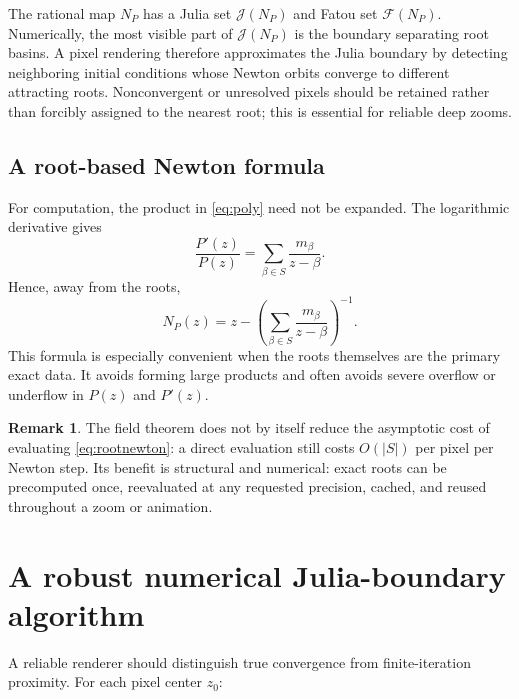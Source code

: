 \documentclass[11pt,a4paper]{article}
\theoremstyle{definition}
\newtheorem{remark}[theorem]{Remark}
\newcommand{\J}{\mathcal{J}}
\newcommand{\Fatou}{\mathcal{F}}
\begin{document}
The rational map $N_P$ has a Julia set $\J(N_P)$ and Fatou set $\Fatou(N_P)$.  Numerically, the most visible part of $\J(N_P)$ is the boundary separating root basins.  A pixel rendering therefore approximates the Julia boundary by detecting neighboring initial conditions whose Newton orbits converge to different attracting roots.  Nonconvergent or unresolved pixels should be retained rather than forcibly assigned to the nearest root; this is essential for reliable deep zooms.

\subsection{A root-based Newton formula}

For computation, the product in \eqref{eq:poly} need not be expanded.  The logarithmic derivative gives
\begin{equation}
\label{eq:logder}
\frac{P'(z)}{P(z)}
=\sum_{\beta\in S}\frac{m_\beta}{z-\beta}.
\end{equation}
Hence, away from the roots,
\begin{equation}
\label{eq:rootnewton}
\boxed{
N_P(z)=z-
\left(
\sum_{\beta\in S}\frac{m_\beta}{z-\beta}
\right)^{-1}.
}
\end{equation}
This formula is especially convenient when the roots themselves are the primary exact data.  It avoids forming large products and often avoids severe overflow or underflow in $P(z)$ and $P'(z)$.

\begin{remark}
The field theorem does not by itself reduce the asymptotic cost of evaluating \eqref{eq:rootnewton}: a direct evaluation still costs $O(|S|)$ per pixel per Newton step.  Its benefit is structural and numerical: exact roots can be precomputed once, reevaluated at any requested precision, cached, and reused throughout a zoom or animation.
\end{remark}

\section{A robust numerical Julia-boundary algorithm}

A reliable renderer should distinguish true convergence from finite-iteration proximity.  For each pixel center $z_0$:
\end{document}
